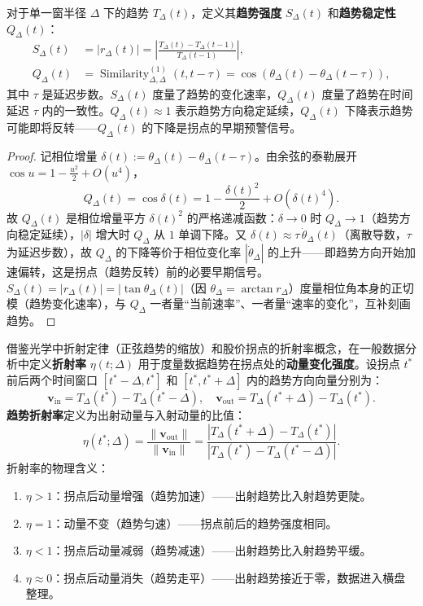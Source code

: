 \begin{proposition}[趋势强度与趋势稳定性]\label{prop:trend_strength_stability}
对于单一窗半径 $\Delta$ 下的趋势 $T_\Delta(t)$，定义其\textbf{趋势强度} $S_\Delta(t)$ 和\textbf{趋势稳定性} $Q_\Delta(t)$：
\[
\begin{aligned}
S_\Delta(t) &= |r_\Delta(t)| = \left|\frac{T_\Delta(t) - T_\Delta(t-1)}{T_\Delta(t-1)}\right|, \\
Q_\Delta(t) &= \operatorname{Similarity}^{(1)}_{\Delta, \Delta}(t, t-\tau) = \cos(\theta_\Delta(t) - \theta_\Delta(t-\tau)),
\end{aligned}
\]
其中 $\tau$ 是延迟步数。$S_\Delta(t)$ 度量了趋势的变化速率，$Q_\Delta(t)$ 度量了趋势在时间延迟 $\tau$ 内的一致性。$Q_\Delta(t) \approx 1$ 表示趋势方向稳定延续，$Q_\Delta(t)$ 下降表示趋势可能即将反转——$Q_\Delta(t)$ 的下降是拐点的早期预警信号。
\end{proposition}

\begin{proof}
记相位增量 $\delta(t) := \theta_\Delta(t) - \theta_\Delta(t-\tau)$。由余弦的泰勒展开 $\cos u = 1 - \frac{u^2}{2} + O(u^4)$，
\[
Q_\Delta(t) = \cos \delta(t) = 1 - \frac{\delta(t)^2}{2} + O(\delta(t)^4).
\]
故 $Q_\Delta(t)$ 是相位增量平方 $\delta(t)^2$ 的严格递减函数：$\delta \to 0$ 时 $Q_\Delta \to 1$（趋势方向稳定延续），$|\delta|$ 增大时 $Q_\Delta$ 从 $1$ 单调下降。又 $\delta(t) \approx \tau\, \dot{\theta}_\Delta(t)$（离散导数，$\tau$ 为延迟步数），故 $Q_\Delta$ 的下降等价于相位变化率 $|\dot{\theta}_\Delta|$ 的上升——即趋势方向开始加速偏转，这是拐点（趋势反转）前的必要早期信号。$S_\Delta(t) = |r_\Delta(t)| = |\tan \theta_\Delta(t)|$（因 $\theta_\Delta = \arctan r_\Delta$）度量相位角本身的正切模（趋势变化速率），与 $Q_\Delta$ 一者量“当前速率”、一者量“速率的变化”，互补刻画趋势。
\end{proof}

\begin{definition}[数据折射率的定义]\label{def:refraction_index_data}
借鉴光学中折射定律（正弦趋势的缩放）和股价拐点的折射率概念，在一般数据分析中定义\textbf{折射率} $\eta(t; \Delta)$ 用于度量数据趋势在拐点处的\textbf{动量变化强度}。设拐点 $t^*$ 前后两个时间窗口 $[t^*-\Delta, t^*]$ 和 $[t^*, t^*+\Delta]$ 内的趋势方向向量分别为：
\[
\mathbf{v}_{\text{in}} = T_\Delta(t^*) - T_\Delta(t^*-\Delta), \quad \mathbf{v}_{\text{out}} = T_\Delta(t^*+\Delta) - T_\Delta(t^*).
\]
\textbf{趋势折射率}定义为出射动量与入射动量的比值：
\[
\eta(t^*; \Delta) = \frac{\|\mathbf{v}_{\text{out}}\|}{\|\mathbf{v}_{\text{in}}\|} = \frac{|T_\Delta(t^*+\Delta) - T_\Delta(t^*)|}{|T_\Delta(t^*) - T_\Delta(t^*-\Delta)|}.
\]
折射率的物理含义：
\begin{enumerate}[label=(\roman*)]
    \item $\eta > 1$：拐点后动量增强（趋势加速）——出射趋势比入射趋势更陡。
    \item $\eta = 1$：动量不变（趋势匀速）——拐点前后的趋势强度相同。
    \item $\eta < 1$：拐点后动量减弱（趋势减速）——出射趋势比入射趋势平缓。
    \item $\eta \approx 0$：拐点后动量消失（趋势走平）——出射趋势接近于零，数据进入横盘整理。
\end{enumerate}
\end{definition}

